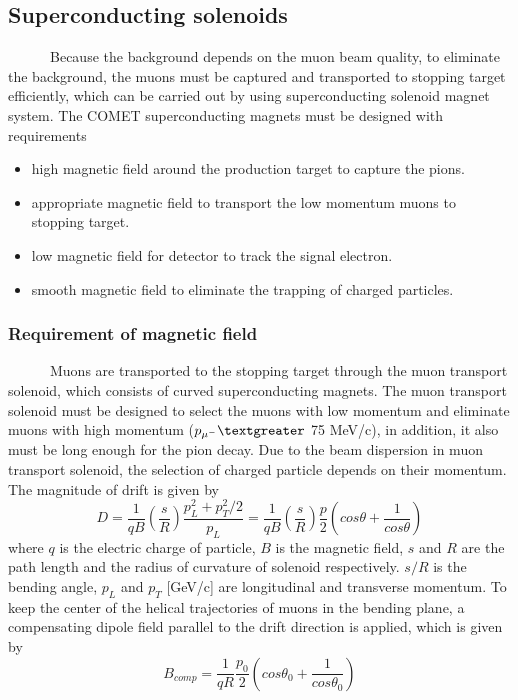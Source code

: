 \subsection{Superconducting solenoids}
~~~~~~Because the background depends on the muon beam quality, to eliminate the background, the muons must be captured and transported to stopping target efficiently, which can be carried out by using superconducting solenoid magnet system.
The COMET superconducting magnets must be designed with requirements
\begin{itemize}
 \setlength{\itemsep}{-5pt} 
 \item high magnetic field around the production target to capture the pions.
 \item appropriate magnetic field to transport the low momentum muons to stopping target.
 \item low magnetic field for detector to track the signal electron.
 \item smooth magnetic field to eliminate the trapping of charged particles.
\end{itemize}

\subsubsection{Requirement of magnetic field}
~~~~~~Muons are transported to the stopping target through the muon transport solenoid, which consists of curved superconducting magnets.
The muon transport solenoid must be designed to select the muons with low momentum and eliminate muons with high momentum ($p_{\mu^-} \textgreater$ 75 MeV/c), in addition, it also must be long enough for the pion decay.
Due to the beam dispersion in muon transport solenoid, the selection of charged particle depends on their momentum.
The magnitude of drift is given by
\begin{equation}
 D = \frac{1}{qB}(\frac{s}{R})\frac{p_L^2 + p_T^2/2}{p_L} = \frac{1}{qB}(\frac{s}{R})\frac{p}{2}(cos\theta + \frac{1}{cos\theta})
\end{equation}
where $q$ is the electric charge of particle, $B$ is the magnetic field, $s$ and $R$ are the path length and the radius of curvature of solenoid respectively.
$s/R$ is the bending angle, $p_L$ and $p_T$ [GeV/c] are longitudinal and transverse momentum.
To keep the center of the helical trajectories of muons in the bending plane, a compensating dipole field parallel to the drift direction is applied, which is given by
\begin{equation}
 B_{comp} = \frac{1}{qR} \frac{p_0}{2} (cos\theta_0 + \frac{1}{cos\theta_0})
\end{equation}

